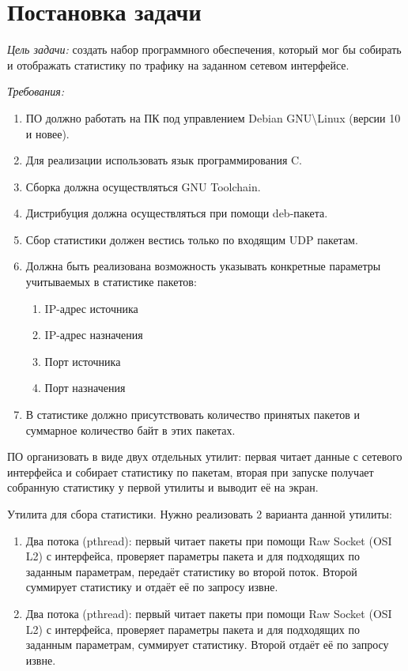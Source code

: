 \section*{Постановка задачи}

\textit{Цель задачи:} создать набор программного обеспечения, который мог бы собирать и
отображать статистику по трафику на заданном сетевом интерфейсе.

\linespace

\textit{Требования:}
\begin{enumerate}
    \item ПО должно работать на ПК под управлением Debian GNU\textbackslash Linux (версии 10 и
новее).
    \item Для реализации использовать язык программирования C.
    \item Сборка должна осуществляться GNU Toolchain.
    \item Дистрибуция должна осуществляться при помощи deb-пакета.
    \item Сбор статистики должен вестись только по входящим UDP пакетам.
    \item Должна быть реализована возможность указывать конкретные параметры учитываемых в статистике пакетов:
    \begin{enumerate}[wide=\dimexpr\parindent+1.25cm, noitemsep]
        \item IP-адрес источника
        \item IP-адрес назначения
        \item Порт источника
        \item Порт назначения
    \end{enumerate}
    \item В статистике должно присутствовать количество принятых пакетов и суммарное
количество байт в этих пакетах.
\end{enumerate}

\linespace

ПО организовать в виде двух отдельных утилит: первая читает данные с сетевого интерфейса и собирает статистику по пакетам, вторая при запуске получает собранную статистику у первой утилиты и выводит её на экран.

\linespace

Утилита для сбора статистики. Нужно реализовать 2 варианта данной утилиты:
\begin{enumerate}
    \item Два потока (pthread): первый читает пакеты при помощи Raw Socket (OSI L2) с интерфейса, проверяет параметры пакета и для подходящих по заданным параметрам, передаёт статистику во второй поток. Второй суммирует статистику и отдаёт её по запросу извне.
    \item Два потока (pthread): первый читает пакеты при помощи Raw Socket (OSI L2) с интерфейса, проверяет параметры пакета и для подходящих по заданным параметрам, суммирует статистику. Второй отдаёт её по запросу извне.
\end{enumerate}

